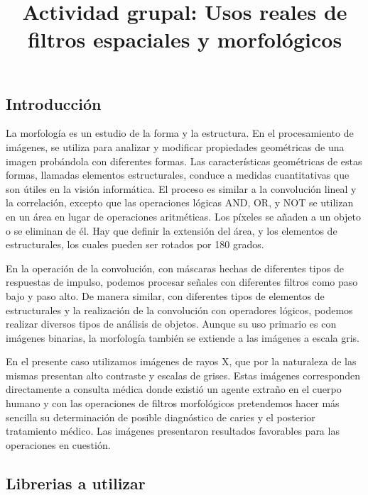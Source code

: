 \documentclass[11pt,a4paper,table]{article}
\title{Actividad grupal: Usos reales de filtros espaciales y morfológicos}
\makeatletter
\let\newtitle\@title
\makeatother
\begin{document}
    
    
    
    
    \hypertarget{actividad-grupal-usos-reales-de-filtros-espaciales-y-morfoluxf3gicos}{%
\textcolor{UnirDark}{\Large\bfseries\newtitle}\label{actividad-grupal-usos-reales-de-filtros-espaciales-y-morfoluxf3gicos}}

\hypertarget{introducciuxf3n}{%
\subsection*{Introducción}\label{introducciuxf3n}}

La morfología es un estudio de la forma y la estructura. En el
procesamiento de imágenes, se utiliza para analizar y modificar
propiedades geométricas de una imagen probándola con diferentes formas.
Las características geométricas de estas formas, llamadas elementos
estructurales, conduce a medidas cuantitativas que son útiles en la
visión informática. El proceso es similar a la convolución lineal y la
correlación, excepto que las operaciones lógicas AND, OR, y NOT se
utilizan en un área en lugar de operaciones aritméticas. Los píxeles se
añaden a un objeto o se eliminan de él. Hay que definir la extensión del
área, y los elementos de estructurales, los cuales pueden ser rotados
por 180 grados.\cite{Sundararajan_2017}

En la operación de la convolución, con máscaras hechas de diferentes
tipos de respuestas de impulso, podemos procesar señales con diferentes
filtros como paso bajo y paso alto. De manera similar, con diferentes
tipos de elementos de estructurales y la realización de la convolución
con operadores lógicos, podemos realizar diversos tipos de análisis de
objetos. Aunque su uso primario es con imágenes binarias, la morfología
también se extiende a las imágenes a escala gris.\cite{Sundararajan_2017}

En el presente caso utilizamos imágenes de rayos X, que por la
naturaleza de las mismas presentan alto contraste y escalas de grises.
Estas imágenes corresponden directamente a consulta médica donde existió
un agente extraño en el cuerpo humano y con las operaciones de filtros
morfológicos pretendemos hacer más sencilla su determinación de posible
diagnóstico de caries y el posterior tratamiento médico. Las imágenes
presentaron resultados favorables para las operaciones en cuestión.

    \hypertarget{librerias-a-utilizar}{%
\subsection*{Librerias a utilizar}\label{librerias-a-utilizar}}
\end{document}
